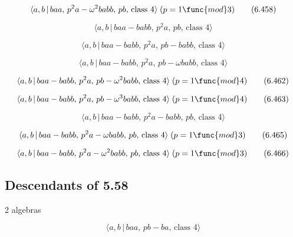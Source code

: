 \documentclass[10pt]{article}
\begin{document}
\begin{equation}
\langle a,b\,|\,baa,\,p^2a-\omega ^2babb,\,pb,\,\text{class }4\rangle\;(p=1 
\func{mod} 3)  \tag{6.458}
\end{equation}

\begin{equation}
\langle a,b\,|\,baa-babb,\,p^2a,\,pb,\,\text{class }4\rangle  \tag{6.459}
\end{equation}

\begin{equation}
\langle a,b\,|\,baa-babb,\,p^2a,\,pb-babb,\,\text{class }4\rangle 
\tag{6.460}
\end{equation}

\begin{equation}
\langle a,b\,|\,baa-babb,\,p^2a,\,pb-\omega babb,\,\text{class }4\rangle 
\tag{6.461}
\end{equation}

\begin{equation}
\langle a,b\,|\,baa-babb,\,p^2a,\,pb-\omega ^2babb,\,\text{class }%
4\rangle\;(p=1 \func{mod} 4)  \tag{6.462}
\end{equation}

\begin{equation}
\langle a,b\,|\,baa-babb,\,p^2a,\,pb-\omega ^3babb,\,\text{class }%
4\rangle\;(p=1 \func{mod} 4)  \tag{6.463}
\end{equation}

\begin{equation}
\langle a,b\,|\,baa-babb,\,p^2a-babb,\,pb,\,\text{class }4\rangle 
\tag{6.464}
\end{equation}

\begin{equation}
\langle a,b\,|\,baa-babb,\,p^2a-\omega babb,\,pb,\,\text{class }%
4\rangle\;(p=1 \func{mod} 3)  \tag{6.465}
\end{equation}

\begin{equation}
\langle a,b\,|\,baa-babb,\,p^2a-\omega ^2babb,\,pb,\,\text{class }%
4\rangle\;(p=1 \func{mod} 3)  \tag{6.466}
\end{equation}

\subsection{Descendants of 5.58}

2 algebras

\begin{equation}
\langle a,b\,|\,baa,\,pb-ba,\,\text{class }4\rangle  \tag{6.467}
\end{equation}
\end{document}
